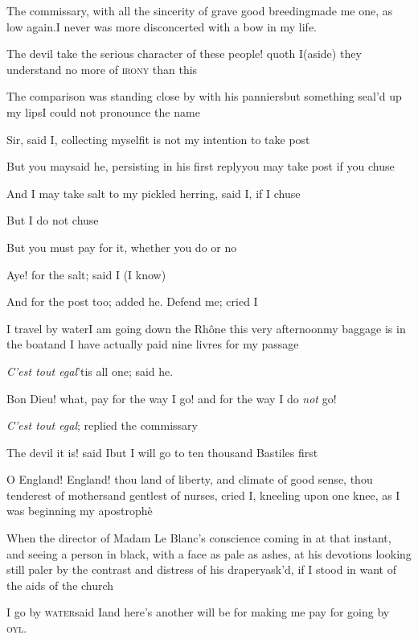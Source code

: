 \documentclass{article}
\begin{document}
The commissary, with all the sincerity of grave good breeding\tsk made me one, as low
again.\tsh I never was more disconcerted with a bow in my life.

\tsh The devil take the serious character of these
people! quoth I\tsk (aside) they understand no more of \textsc{irony} than
this\tsh

The comparison was standing close by with his panniers\tsk but
something seal’d up my lips\tsk I could not pronounce the
name\tsh

Sir, said I, collecting myself\tsk it is not my intention to
take post\tsh

\tsk But you may\tsk said he, persisting in his first
reply\tsk you may take post if you chuse\tsh

\tsk And I may take salt to my pickled herring, said I, if I
chuse\tsh

\tsk But I do not chuse\tsk

\tsk But you must pay for it, whether you do or no\tsh

Aye! for the salt; said I (I know)\tsh{}

\tsk And for the post too; added he. Defend me; cried
I\tsh

I travel by water\tsk I am going down the Rhône this very afternoon\tsk my baggage is in
the boat\tsk and I have actually paid nine livres for my passage\tsh

\textit{C’est tout egal}\tsk ’tis all one; said
he.

Bon Dieu! what, pay for the way I go! and for the way I
do \textit{not} go!

\tsh \textit{C’est tout egal}; replied the
commissary\tsh

\tsh The devil it is! said I\tsk but I will go to ten
thousand Bastiles first\tsh

O England! England! thou land of liberty, and
climate of good sense, thou tenderest of mothers\tsk and gentlest
of nurses, cried I, kneeling upon one knee, as I was beginning my
apostrophè\tsh{}

When the director of Madam Le Blanc’s conscience
coming in at that instant, and seeing a person in black, with a
face as pale as ashes, at his devotions\break
\tsk looking still paler by the contrast and distress of his
drapery\tsk ask’d, if I stood in want of the aids of the
church\tsh

I go by \textsc{water}\tsk said I\tsk and here’s
another will be for making me pay for going by
\textsc{oyl}.
\end{document}
